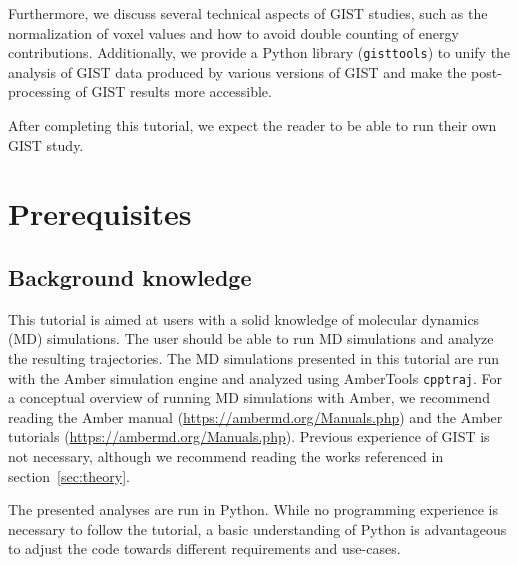 \documentclass[9pt,tutorial]{livecoms}
\newcommand{\software}{\texttt}
\begin{document}
Furthermore, we discuss several technical aspects of GIST studies, such as the normalization of voxel values and how to avoid double counting of energy contributions. 
Additionally, we provide a Python library (\software{gisttools}) to unify the analysis of GIST data produced by various versions of GIST and make the post-processing of GIST results more accessible.

After completing this tutorial, we expect the reader to be able to run their own GIST study. 

%

\section{Prerequisites}


\subsection{Background knowledge}
This tutorial is aimed at users with a solid knowledge of molecular dynamics (MD) simulations.
The user should be able to run MD simulations and analyze the resulting trajectories. 
The MD simulations presented in this tutorial are run with the Amber simulation engine and analyzed using AmberTools \software{cpptraj}. 
For a conceptual overview of running MD simulations with Amber, we recommend reading the Amber manual (\url{https://ambermd.org/Manuals.php}) \cite{amber22} and the Amber tutorials (\url{https://ambermd.org/Manuals.php}). 
Previous experience of GIST is not necessary, although we recommend reading the works referenced in section~\ref{sec:theory}.

The presented analyses are run in Python.
While no programming experience is necessary to follow the tutorial, a basic understanding of Python is advantageous to adjust the code towards different requirements and use-cases.
\end{document}
